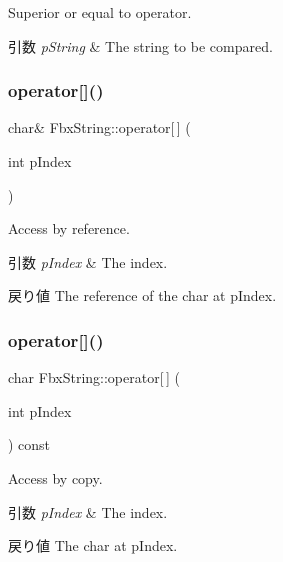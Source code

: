 Superior or equal to operator. 
\begin{DoxyParams}{引数}
{\em p\+String} & The string to be compared. \\
\hline
\end{DoxyParams}
\mbox{\label{class_fbx_string_a64128ed6e3448248104ccb7c3a2bec1c}} 
\subsubsection{\texorpdfstring{operator[]()}{operator[]()}\hspace{0.1cm}{\footnotesize\ttfamily [1/2]}}
{\footnotesize\ttfamily char\& Fbx\+String\+::operator\mbox{[}$\,$\mbox{]} (\begin{DoxyParamCaption}\item[{int}]{p\+Index }\end{DoxyParamCaption})}

Access by reference. 
\begin{DoxyParams}{引数}
{\em p\+Index} & The index. \\
\hline
\end{DoxyParams}
\begin{DoxyReturn}{戻り値}
The reference of the char at p\+Index. 
\end{DoxyReturn}
\mbox{\label{class_fbx_string_a8c9dc4db6de88fef3281566da81d74e7}} 
\subsubsection{\texorpdfstring{operator[]()}{operator[]()}\hspace{0.1cm}{\footnotesize\ttfamily [2/2]}}
{\footnotesize\ttfamily char Fbx\+String\+::operator\mbox{[}$\,$\mbox{]} (\begin{DoxyParamCaption}\item[{int}]{p\+Index }\end{DoxyParamCaption}) const}

Access by copy. 
\begin{DoxyParams}{引数}
{\em p\+Index} & The index. \\
\hline
\end{DoxyParams}
\begin{DoxyReturn}{戻り値}
The char at p\+Index. 
\end{DoxyReturn}
\mbox{\label{class_fbx_string_a941a76b41dc91d4dfccd447e73567902}} 
